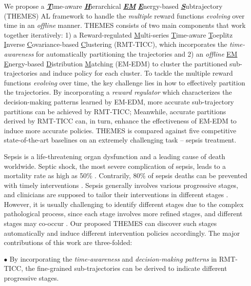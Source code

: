 \documentclass{article}
\begin{document}
We propose a \textbf{\emph{\underline{T}}}ime-aware \textbf{\emph{\underline{H}}}ierarchical \textbf{\emph{\emph{\underline{EM}}}} \textbf{\emph{\underline{E}}}nergy-based \textbf{\emph{\underline{S}}}ubtrajectory (THEMES) AL framework to handle the \emph{multiple} reward functions \emph{evolving} over time in an \emph{offline} manner. THEMES consists of two main components that work together iteratively: 
1) a Reward-regulated \underline{M}ulti-series \underline{T}ime-aware \underline{T}oeplitz \underline{I}nverse \underline{C}ovariance-based \underline{C}lustering (RMT-TICC), which incorporates the \emph{time-awareness} for automatically partitioning the trajectories and 2) an \emph{offline} \underline{EM} \underline{E}nergy-based \underline{D}istribution \underline{M}atching (EM-EDM) to cluster the partitioned sub-trajectories and induce policy for each cluster. To tackle the multiple reward functions \emph{evolving} over time, the key challenge lies in how to effectively partition the trajectories. By incorporating a \textit{reward regulator} which characterizes the decision-making patterns learned by EM-EDM, more accurate sub-trajectory partitions can be achieved by RMT-TICC; Meanwhile, accurate partitions derived by RMT-TICC can, in turn, enhance the effectiveness of EM-EDM to induce more accurate policies. THEMES is compared against five competitive state-of-the-art baselines on an extremely challenging task -- sepsis treatment. 

Sepsis is a life-threatening organ dysfunction and a leading cause of death worldwide. Septic shock, the most severe complication of sepsis, leads to a mortality rate as high as 50\% \cite{martin2003epidemiology}. Contrarily, 80\% of sepsis deaths can be prevented with timely interventions \cite{kumar2006duration}. Sepsis generally involves various progressive stages, and clinicians are supposed to tailor their interventions in different stages \cite{singer2016third}. However, it is usually challenging to identify different stages due to the complex pathological process, since each stage involves more refined stages, and different stages may co-occur \cite{stearns2011pathogenesis}. Our proposed THEMES can discover such stages automatically and induce different intervention policies accordingly. The major contributions of this work are three-folded:

\noindent $\bullet$ By incorporating the \emph{time-awareness} and \emph{decision-making patterns} in RMT-TICC, the fine-grained sub-trajectories can be derived to indicate different progressive stages.
\end{document}
